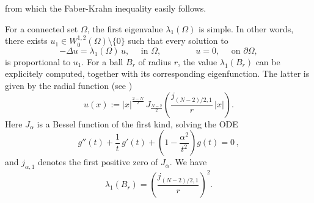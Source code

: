 \documentclass{amsart}
\theoremstyle{definition}
\numberwithin{equation}{section}
\begin{document}
from which the Faber-Krahn inequality easily follows.
\par
For a connected set $\Omega$, the first eigenvalue $\lambda_1(\Omega)$ is simple. In other words, there exists $u_1\in W^{1,2}_0(\Omega)\setminus\{0\}$ such that every solution to
\[
-\Delta u=\lambda_1(\Omega)\, u,\quad \mbox{ in }\Omega,\qquad\qquad u=0,\quad \mbox{ on }\partial\Omega,
\] 
is proportional to $u_1$.
For a ball $B_r$ of radius $r$, the value $\lambda_1(B_r)$ can be explicitely computed, together with its corresponding eigenfunction. The latter is given by the radial function (see \cite{MR2251558})
\[
u(x):=|x|^\frac{2-N}{2}\,J_\frac{N-2}{2}\left(\frac{j_{(N-2)/2,1}}{r}\,|x|\right).
\]
Here $J_\alpha$ is a Bessel function of the first kind, solving the ODE
\[
g''(t)+\frac{1}{t}\,g'(t)+\left(1-\frac{\alpha^2}{t^2}\right)g(t)=0\,,
\]
and $j_{\alpha,1}$ denotes the first positive zero of $J_{\alpha}$. We have
\begin{equation}
\label{lambda1palla}
\lambda_1(B_r)=\left(\frac{j_{(N-2)/2,1}}{r}\right)^2.
\end{equation}
\end{document}
